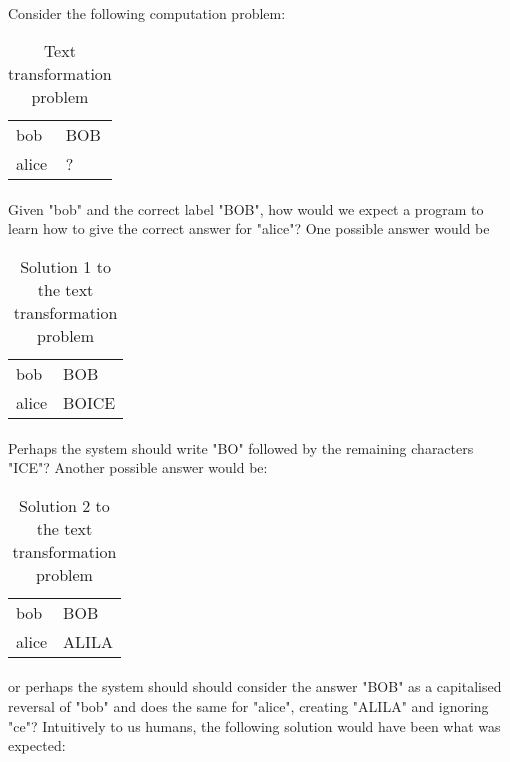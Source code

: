 \documentclass{article}
\theoremstyle{plain}
\theoremstyle{definition}
\begin{document}
\begin{multicols}{2}
\paragraph{} Consider the following computation problem:

\begin{table}[H]
\centering\footnotesize
\begin{tabular}{ | l | l | }
\hline
bob & BOB \\
alice & ?\\
\hline
\end{tabular}
\caption{Text transformation problem}\label{table:MILTextTransformation}
\end{table}

\paragraph{} Given "bob" and the correct label "BOB", how would we expect a program to learn how to give the correct answer for "alice"? One possible answer would be

\begin{table}[H]
\centering\footnotesize
\begin{tabular}{ | l | l | }
\hline
bob & BOB \\
alice & BOICE\\
\hline
\end{tabular}
\caption{Solution 1 to the text transformation problem}\label{table:MILTextTransformation2}
\end{table}

\paragraph{} Perhaps the system should write "BO" followed by the remaining characters "ICE"? Another possible answer would be:

\begin{table}[H]
\centering\footnotesize
\begin{tabular}{ | l | l | }
\hline
bob & BOB \\
alice & ALILA\\
\hline
\end{tabular}
\caption{Solution 2 to the text transformation problem}\label{table:MILTextTransformation3}
\end{table}


\paragraph{} or perhaps the system should should consider the answer "BOB" as a capitalised reversal of "bob" and does the same for "alice", creating "ALILA" and ignoring "ce"? Intuitively to us humans, the following solution would have been what was expected:


\end{multicols}
\end{document}
